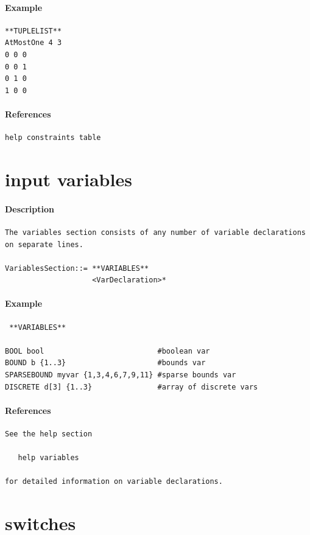 \documentclass[oneside]{book}
\begin{document}
\paragraph{Example}
{\footnotesize
\begin{verbatim}
**TUPLELIST**
AtMostOne 4 3
0 0 0
0 0 1
0 1 0
1 0 0
\end{verbatim}
}
\paragraph{References}
{\footnotesize
\begin{verbatim}
help constraints table
\end{verbatim}
}
\section{input variables}
\paragraph{Description}
{\footnotesize
\begin{verbatim}
The variables section consists of any number of variable declarations
on separate lines.

VariablesSection::= **VARIABLES**
                    <VarDeclaration>*
\end{verbatim}
}
\paragraph{Example}
{\footnotesize
\begin{verbatim}
 **VARIABLES**

BOOL bool                          #boolean var
BOUND b {1..3}                     #bounds var
SPARSEBOUND myvar {1,3,4,6,7,9,11} #sparse bounds var
DISCRETE d[3] {1..3}               #array of discrete vars
\end{verbatim}
}
\paragraph{References}
{\footnotesize
\begin{verbatim}
See the help section

   help variables

for detailed information on variable declarations.
\end{verbatim}
}
\section{switches}
\end{document}
